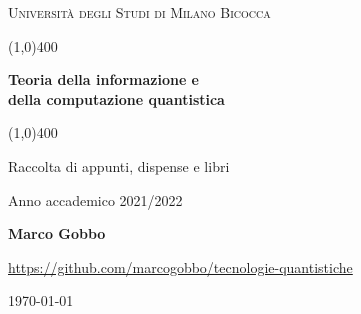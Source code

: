 \documentclass[a4paper, 12pt]{book}
\begin{document}
    \begin{titlepage}
        \begin{center}
            \vspace*{5cm}
            {\scshape\LARGE Università degli Studi di Milano Bicocca \par}
            \vspace{1.0cm}
            \line(1,0){400} \\
            {\huge\bfseries Teoria della informazione e \\ della computazione quantistica \par}
            \line(1,0){400} \\
 	        \vspace{0.5cm}
            {\Large Raccolta di appunti, dispense e libri \par}
            \vspace{1.0cm}
            {Anno accademico 2021/2022 \par}
            \vspace{0.5cm}
            {\bfseries Marco Gobbo \par}
            \vspace{0.5cm}
            {\url{https://github.com/marcogobbo/tecnologie-quantistiche} \par}
            \vspace*{\fill}
            {\large \today \par}
        \end{center}
    \end{titlepage}
    \tableofcontents
    
\end{document}
